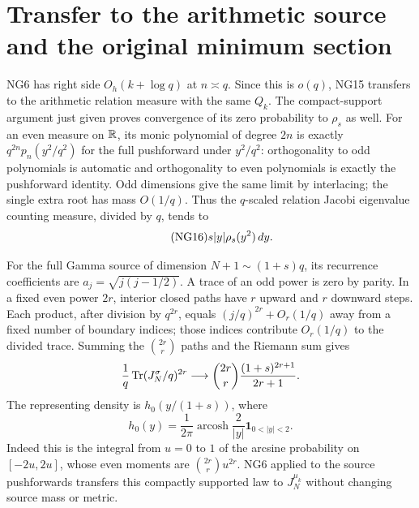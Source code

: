 \documentclass[11pt]{article}
\begin{document}
\section{Transfer to the arithmetic source and the original minimum section}
NG6 has right side $O_h(k+\log q)$ at $n\asymp q$. Since this is
$o(q)$, NG15 transfers to the arithmetic relation measure with the
same $Q_k$. The compact-support argument just given proves convergence
of its zero probability to $\rho_s$ as well. For an even measure on
$\mathbb R$, its monic polynomial of degree $2n$ is exactly
$q^{2n}p_n(y^2/q^2)$ for the full pushforward under $y^2/q^2$:
orthogonality to odd polynomials is automatic and orthogonality to
even polynomials is exactly the pushforward identity. Odd dimensions
give the same limit by interlacing; the single extra root has mass
$O(1/q)$. Thus the $q$-scaled relation Jacobi eigenvalue counting
measure, divided by $q$, tends to
\begin{equation}\tag{NG16}
                         s|y|\rho_s(y^2)\,d y.
\end{equation}

For the full Gamma source of dimension $N+1\sim(1+s)q$, its recurrence
coefficients are $a_j=\sqrt{j(j-1/2)}$. A trace of an odd power is zero
by parity. In a fixed even power $2r$, interior closed paths have $r$
upward and $r$ downward steps. Each product, after division by $q^{2r}$,
equals $(j/q)^{2r}+O_r(1/q)$ away from a fixed number of boundary
indices; those indices contribute $O_r(1/q)$ to the divided trace.
Summing the $\binom{2r}{r}$ paths and the Riemann sum gives
\[
 \frac1q\operatorname{Tr}(J_N^\sigma/q)^{2r}\longrightarrow
 \binom{2r}{r}\frac{(1+s)^{2r+1}}{2r+1}.
\]
The representing density is $h_0(y/(1+s))$, where
\begin{equation}\tag{NG17}
 h_0(y)=\frac1{2\pi}\operatorname{arcosh}\frac2{|y|}
                      \mathbf1_{0<|y|<2}.
\end{equation}
Indeed this is the integral from $u=0$ to $1$ of the arcsine probability
on $[-2u,2u]$, whose even moments are $\binom{2r}{r}u^{2r}$.
NG6 applied to the source pushforwards transfers this compactly
supported law to $J_N^{\mu_k}$ without changing source mass or metric.
\end{document}
